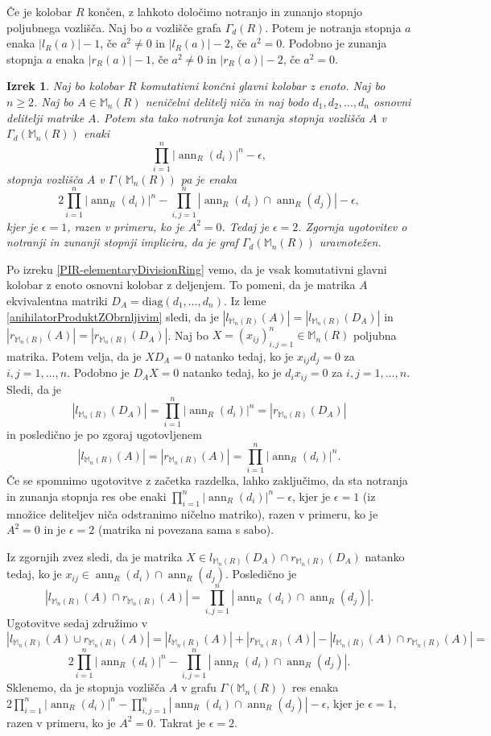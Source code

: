 \documentclass[a4paper, 12pt]{amsart}
\theoremstyle{definition} %
\theoremstyle{plain} %
\newtheorem{izrek}[definicija]{Izrek}
\newcommand{\M}{\mathbb M}
\DeclareMathOperator{\ann}{ann}
\begin{document}
Če je kolobar $R$ končen, z lahkoto določimo notranjo in zunanjo stopnjo poljubnega vozlišča. Naj bo $a$ vozlišče grafa $\Gamma_d(R)$. Potem je notranja stopnja $a$ enaka $|l_R(a)|-1$, če $a^2 \neq 0$ in $|l_R(a)|-2$, če $a^2 = 0$. Podobno je zunanja stopnja $a$ enaka $|r_R(a)|-1$, če $a^2 \neq 0$ in $|r_R(a)| - 2$, če $a^2 = 0$.

\begin{izrek}
\label{inDegreeOutDegree}
Naj bo kolobar $R$ komutativni končni glavni kolobar z enoto. Naj bo $n \ge 2$. Naj bo $A\in \M_n(R)$ neničelni delitelj niča in naj bodo $d_1,d_2, \dots,d_n$ osnovni delitelji matrike $A$. Potem sta tako notranja kot zunanja stopnja vozlišča $A$ v $\Gamma_d(\M_n(R))$ enaki
$$
\prod_{i=1}^n |\ann_R(d_i)|^n - \epsilon,
$$ 
stopnja vozlišča $A$ v $\Gamma(\M_n(R))$ pa je enaka
$$
2\prod_{i=1}^n |\ann_R(d_i)|^n - \prod_{i,j=1}^n |\ann_R(d_i) \cap \ann_R(d_j)| - \epsilon,
$$
kjer je $\epsilon =1$, razen v primeru, ko je $A^2 = 0$. Tedaj je $\epsilon = 2$. Zgornja ugotovitev o notranji in zunanji stopnji implicira, da je graf $\Gamma_d(\M_n(R))$ uravnotežen.
\end{izrek}
 
\proof
Po izreku  \ref{PIR-elementaryDivisionRing} vemo, da je vsak komutativni glavni kolobar z enoto osnovni kolobar z deljenjem. To pomeni, da je matrika $A$ ekvivalentna matriki $D_A= \text{diag}(d_1,\dots,d_n)$. Iz leme \ref{anihilatorProduktZObrnljivim} sledi, da je $|l_{\M_n(R)}(A)| = |l_{\M_n(R)}(D_A)|$ in $|r_{\M_n(R)}(A)| = |r_{\M_n(R)}(D_A)|$. Naj bo  $X=(x_{ij})_{i,j=1}^n\in \M_n(R)$ poljubna matrika. Potem velja, da je $XD_A = 0$ natanko tedaj, ko je $x_{ij}d_j = 0$ za $i,j = 1, \dots, n$. Podobno je $D_AX = 0$ natanko tedaj, ko je $d_i x_{ij} =0 $ za $i,j=1,\dots,n$. Sledi, da je 
$$
|l_{\M_n(R)}(D_A)| = \prod_{i=1}^n |\ann_R(d_i)|^n = |r_{\M_n(R)}(D_A)|
$$
in posledično je po zgoraj ugotovljenem
$$
|l_{\M_n(R)}(A)|= |r_{\M_n(R)}(A)| = \prod_{i=1}^n |\ann_R(d_i)|^n .
$$
Če se spomnimo ugotovitve z začetka razdelka, lahko zaključimo, da sta notranja in zunanja stopnja res obe enaki $\prod_{i=1}^n  |\ann_R(d_i)|^n - \epsilon$, kjer je $\epsilon = 1$ (iz množice deliteljev niča odstranimo ničelno matriko), razen v primeru, ko je $A^2 = 0$ in je $\epsilon = 2$ (matrika ni povezana sama s sabo). 

Iz zgornjih zvez sledi, da je matrika $X\in l_{\M_n(R)}(D_A)\cap r_{\M_n(R)}(D_A)$ natanko tedaj, ko je $x_{ij} \in  \ann_R(d_i)\cap \ann_R(d_j)$. Posledično je 
$$
|l_{\M_n(R)}(A) \cap r_{\M_n(R)}(A)| = \prod_{i,j=1}^n | \ann_R(d_i) \cap \ann_R(d_j)|.
$$
Ugotovitve sedaj združimo v 
$$
|l_{\M_n(R)}(A) \cup r_{\M_n(R)}(A)| = |l_{\M_n(R)}(A)|  + |r_{\M_n(R)}(A)| - |l_{\M_n(R)}(A) \cap r_{\M_n(R)}(A)|=
$$
$$
2\prod_{i=1}^n |\ann_R(d_i)|^n - \prod_{i,j=1}^n |\ann_R(d_i) \cap \ann_R(d_j)|.
$$
Sklenemo, da je stopnja vozlišča $A$ v grafu $\Gamma(\M_n(R))$ res enaka $2\prod_{i=1}^n |\ann_R(d_i)|^n - \prod_{i,j=1}^n |\ann_R(d_i) \cap \ann_R(d_j)| -\epsilon$, kjer je $\epsilon=1$, razen v primeru, ko je $A^2 = 0$. Takrat je $\epsilon=2$.
\endproof
\end{document}
